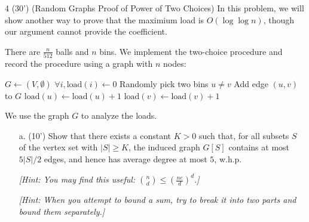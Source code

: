 \begin{question}{4 (30') (Random Graphs Proof of Power of Two Choices)} In this problem, we will show another way to prove that the maximium load is $O(\log \log n)$, though our argument cannot provide the coefficient. 
    
    There are $\frac{n}{512}$ balls and $n$ bins. We implement the two-choice procedure and record the procedure using a graph with $n$ nodes:
    

\begin{algo}
    \caption{Power of Two Choices}
    \label{alg:two-choices}
    \centering
    \begin{algorithmic}[1]
        \State $G \leftarrow (V,\emptyset)$
        \State $\forall i, \mathrm{load}(i) \leftarrow 0$
            \State Randomly pick two bins $u\neq v$
            \State Add edge $(u,v)$ to $G$
                \State $\mathrm{load}(u) \leftarrow \mathrm{load}(u) + 1$ 
            \Else
                \State $\mathrm{load}(v) \leftarrow \mathrm{load}(v) + 1$ 
            \EndIf
        \EndFor
    \end{algorithmic}
\end{algo}

We use the graph $G$ to analyze the loads. 
    \begin{itemize}
        \item [a. (10')] Show that there exists a constant $K > 0$ such that, for all subsets $S$ of the vertex set with $|S| \ge K$, the induced graph $G[S]$ contains at most $5|S|/2$ edges, and hence has average degree at most $5$, w.h.p.
        
        \textit{[Hint: You may find this useful: $\binom{n}{d}\le \left(\frac{ne}{d}\right)^d$.]}
        
        \textit{[Hint: When you attempt to bound a sum, try to break it into two parts and bound them separately.]}
        

\end{itemize}
\end{question}
